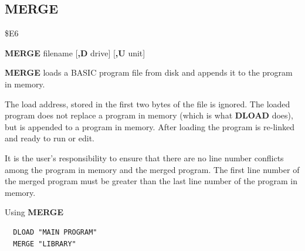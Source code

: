 \subsection{MERGE}
\begin{description}[leftmargin=2cm,style=nextline]
\item [Token:] \$E6
\item [Format:] {\bf MERGE} filename [{\bf,D} drive] [{\bf,U} unit]
\item [Usage:] {\bf MERGE} loads a BASIC program file from disk
               and appends it to the program in memory.

   \filenamedefinition

   \drivedefinition

   \unitdefinition

\item [Remarks:]
   The load address, stored in the first two bytes
   of the file is ignored. The loaded program does not
   replace a program in memory (which is what {\bf DLOAD} does),
   but is appended to a program in memory.
   After loading the program is re-linked
   and ready to run or edit.

   It is the user's responsibility to ensure that there
   are no line number conflicts among the program in memory and
   the merged program. The first line number of the merged
   program must be greater than the last line number of the
   program in memory.

\item [Example:] Using {\bf MERGE}
\begin{tcolorbox}[colback=black,coltext=white]
\verbatimfont{\codefont}
\begin{verbatim}
  DLOAD "MAIN PROGRAM"
  MERGE "LIBRARY"
\end{verbatim}
\end{tcolorbox}
\end{description}


\newpage
